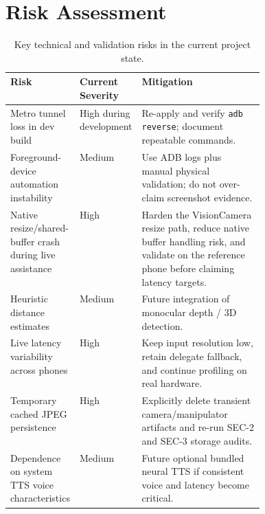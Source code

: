 \documentclass[conference]{IEEEtran}
\begin{document}
\section{Risk Assessment}
\begin{table}[!t]
\centering
\small
\begin{tabularx}{\linewidth}{>{\raggedright\arraybackslash}p{0.25\linewidth} >{\raggedright\arraybackslash}p{0.18\linewidth} >{\raggedright\arraybackslash}X}
\toprule
Risk & Current Severity & Mitigation \\
\midrule
Metro tunnel loss in dev build & High during development & Re-apply and verify \texttt{adb reverse}; document repeatable commands. \\
Foreground-device automation instability & Medium & Use ADB logs plus manual physical validation; do not over-claim screenshot evidence. \\
Native resize/shared-buffer crash during live assistance & High & Harden the VisionCamera resize path, reduce native buffer handling risk, and validate on the reference phone before claiming latency targets. \\
Heuristic distance estimates & Medium & Future integration of monocular depth / 3D detection. \\
Live latency variability across phones & High & Keep input resolution low, retain delegate fallback, and continue profiling on real hardware. \\
Temporary cached JPEG persistence & High & Explicitly delete transient camera/manipulator artifacts and re-run SEC-2 and SEC-3 storage audits. \\
Dependence on system TTS voice characteristics & Medium & Future optional bundled neural TTS if consistent voice and latency become critical. \\
\bottomrule
\end{tabularx}
\caption{Key technical and validation risks in the current project state.}
\label{tab:risk}
\end{table}
\end{document}
